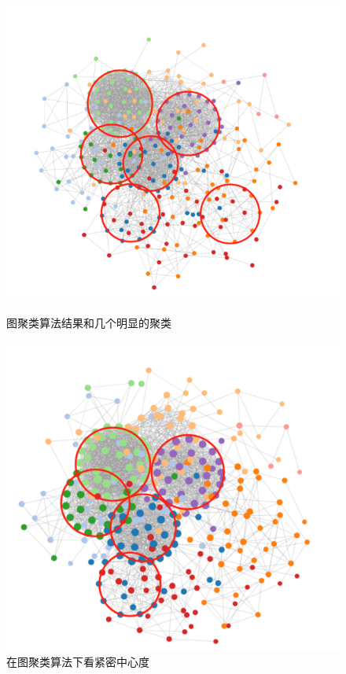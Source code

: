 \documentclass[UTF8, onecolumn, a4paper]{article}
\begin{document}
\begin{center}
	\begin{figure}[ht] %
		\centering %
		\begin{minipage}[b]{0.95\linewidth} %
			\begin{minipage}[b]{0.47\linewidth} %
				\centering
				\includegraphics[width=\linewidth]{../pictures/show21}
				\caption{图聚类算法结果和几个明显的聚类}
			\end{minipage}
			\hfill
			\begin{minipage}[b]{0.46\linewidth}
				\centering
				\includegraphics[width=\linewidth]{../pictures/show22}
				\caption{在图聚类算法下看紧密中心度}
			\end{minipage}
		\end{minipage}
	\end{figure}
\end{center}
\end{document}

